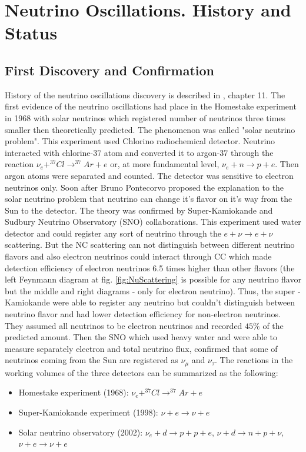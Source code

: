 \section{Neutrino Oscillations. History and Status}
\subsection{First Discovery and Confirmation}
History of the neutrino oscillations discovery is described in \cite{ref_Griffiths}, chapter 11. The first evidence of the neutrino oscillations had place in the Homestake experiment in 1968 with solar neutrinos which registered number of neutrinos three times smaller then theoretically predicted. The phenomenon was called "solar neutrino problem". This experiment used Chlorino radiochemical detector. Neutrino interacted with chlorine-37 atom and converted it to argon-37 through the reaction $\nu_e+^{37}Cl \rightarrow ^{37}Ar+e$ or, at more fundamental level, $\nu_e+n \rightarrow p+e$. Then argon atoms were separated and counted. The detector was sensitive to electron neutrinos only. Soon after Bruno Pontecorvo proposed the explanation to the solar neutrino problem that neutrino can change it's flavor on it's way from the Sun to the detector. The theory was confirmed  by Super-Kamiokande and Sudbury Neutrino Observatory (SNO) collaborations. This experiment used water detector and could register any sort of neutrino through the $e+\nu \rightarrow e+\nu$ scattering. But the NC scattering can not distinguish between different neutrino flavors and also electron neutrinos could interact through CC which made detection efficiency of electron neutrinos 6.5 times higher than other flavors (the left Feynmann diagram at fig. \ref{fig:NuScattering} is possible for any neutrino flavor but the middle and right diagrams - only for electron neutrino). Thus, the super -Kamiokande were able to register any neutrino but couldn't distinguish between neutrino flavor and had lower detection efficiency for non-electron neutrinos. They assumed all neutrinos to be electron neutrinos and recorded $45\%$ of the predicted amount. Then the SNO which used heavy water and were able to measure separately electron and total neutrino flux, confirmed that some of neutrinos coming from the Sun are registered as $\nu_\mu$ and $\nu_\tau$. The reactions in the working volumes of the three detectors can be summarized as the following:\\
\begin{itemize}
\item Homestake experiment (1968): $\nu_e + ^{37}Cl \rightarrow ^{37}Ar+e$
\item Super-Kamiokande experiment (1998): $\nu + e \rightarrow \nu + e$ 
\item Solar neutrino observatory (2002): $\nu_e + d \rightarrow p+p+e$, $\nu+d \rightarrow n+p+\nu$, $\nu+e \rightarrow \nu+e$
\end{itemize}
